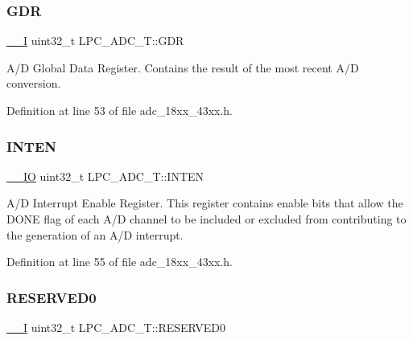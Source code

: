 \subsubsection{\texorpdfstring{G\+DR}{GDR}}
{\footnotesize\ttfamily \hyperlink{core__sc300_8h_af63697ed9952cc71e1225efe205f6cd3}{\+\_\+\+\_\+I} uint32\+\_\+t L\+P\+C\+\_\+\+A\+D\+C\+\_\+\+T\+::\+G\+DR}

A/D Global Data Register. Contains the result of the most recent A/D conversion. 

Definition at line 53 of file adc\+\_\+18xx\+\_\+43xx.\+h.

\mbox{\label{struct_l_p_c___a_d_c___t_a3ed883c378f817342d10cb7ed29a05ae}} 
\subsubsection{\texorpdfstring{I\+N\+T\+EN}{INTEN}}
{\footnotesize\ttfamily \hyperlink{core__sc300_8h_aec43007d9998a0a0e01faede4133d6be}{\+\_\+\+\_\+\+IO} uint32\+\_\+t L\+P\+C\+\_\+\+A\+D\+C\+\_\+\+T\+::\+I\+N\+T\+EN}

A/D Interrupt Enable Register. This register contains enable bits that allow the D\+O\+NE flag of each A/D channel to be included or excluded from contributing to the generation of an A/D interrupt. 

Definition at line 55 of file adc\+\_\+18xx\+\_\+43xx.\+h.

\mbox{\label{struct_l_p_c___a_d_c___t_afeba3e59f72b009dfb03377557ddcd60}} 
\subsubsection{\texorpdfstring{R\+E\+S\+E\+R\+V\+E\+D0}{RESERVED0}}
{\footnotesize\ttfamily \hyperlink{core__sc300_8h_af63697ed9952cc71e1225efe205f6cd3}{\+\_\+\+\_\+I} uint32\+\_\+t L\+P\+C\+\_\+\+A\+D\+C\+\_\+\+T\+::\+R\+E\+S\+E\+R\+V\+E\+D0}



